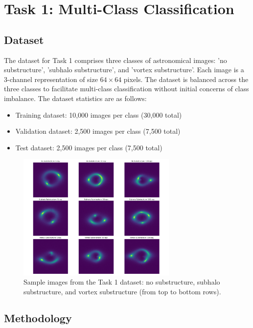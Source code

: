 \documentclass[11pt,a4paper]{article}
\begin{document}
\section{Task 1: Multi-Class Classification}

\subsection{Dataset}
The dataset for Task 1 comprises three classes of astronomical images: 'no substructure', 'subhalo substructure', and 'vortex substructure'. Each image is a 3-channel representation of size $64 \times 64$ pixels. The dataset is balanced across the three classes to facilitate multi-class classification without initial concerns of class imbalance. The dataset statistics are as follows:

\begin{itemize}
    \item Training dataset: 10,000 images per class (30,000 total)
    \item Validation dataset: 2,500 images per class (7,500 total)
    \item Test dataset: 2,500 images per class (7,500 total)
\end{itemize}

\begin{figure}[H]
    \centering
    \includegraphics[width=0.7\textwidth]{../Task1/results/sample_images_multi.png}
    \caption{Sample images from the Task 1 dataset: no substructure, subhalo substructure, and vortex substructure (from top to bottom rows).}
    \label{fig:sample_images_multi}
\end{figure}

\subsection{Methodology}
\end{document}

